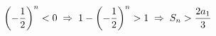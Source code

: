\documentclass[preview]{standalone}
\begin{document}
\begin{align*}
\special{dvisvgm:raw <g id='unique000'>}\left(-\frac{1}{2}\right)^n<0 \;\Rightarrow\;  \special{dvisvgm:raw </g>}\special{dvisvgm:raw <g id='unique001'>}1-\left(-\frac{1}{2}\right)^n >1 \;\Rightarrow\; \special{dvisvgm:raw </g>}\special{dvisvgm:raw <g id='unique002'>}S_n>\frac{2a_1}{3}\special{dvisvgm:raw </g>}
\end{align*}
\end{document}
